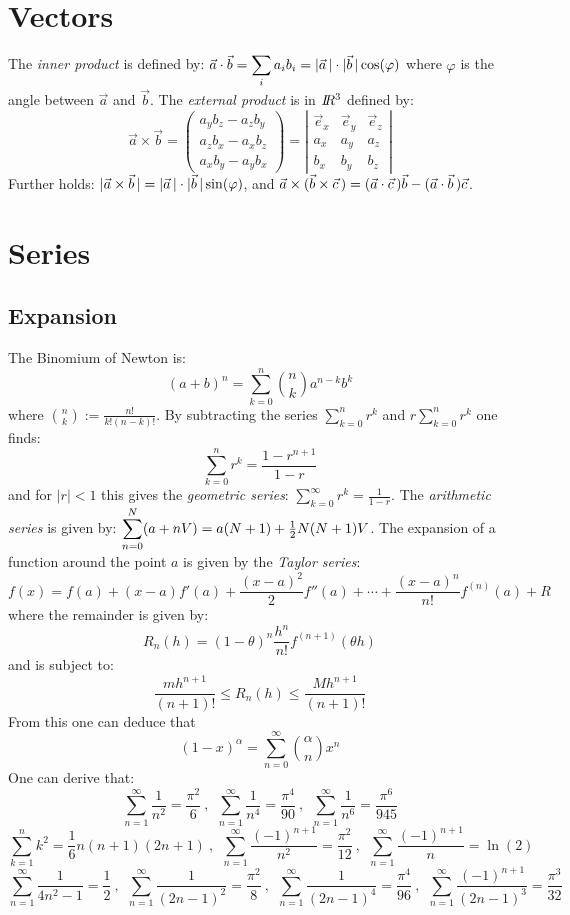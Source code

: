 \documentclass[a4paper,fancyheadings,twoside]{report}
\begin{document}
\section{Vectors}
The {\it inner product} is defined by:
$\displaystyle\vec{a}\cdot\vec{b}=\sum_i a_ib_i=|\vec{a}\,|\cdot|\vec{b}\,|\cos(\varphi)$
\npar
where $\varphi$ is the angle between $\vec{a}$ and $\vec{b}$. The {\it external
product} is in $I\hspace{-1mm}R^3$ defined by:
\[
\vec{a}\times\vec{b}=\left(\begin{array}{c}
a_yb_z-a_zb_y\\
a_zb_x-a_xb_z\\
a_xb_y-a_yb_x\end{array}\right)=
\left|\begin{array}{ccc}
\vec{e}_x&\vec{e}_y&\vec{e}_z\\
a_x&a_y&a_z\\
b_x&b_y&b_z\end{array}\right|
\]
Further holds: $|\vec{a}\times\vec{b}\,|=|\vec{a}\,|\cdot|\vec{b}\,|\sin(\varphi)$, and
$\vec{a}\times(\vec{b}\times\vec{c}\,)=(\vec{a}\cdot\vec{c}\,)\vec{b}-(\vec{a}\cdot\vec{b}\,)\vec{c}$.

\section{Series}
\subsection{Expansion}
The Binomium of Newton is:
\[
(a+b)^n=\sum_{k=0}^n{n\choose k}a^{n-k}b^k
\]
where $\displaystyle{n\choose k}:=\frac{n!}{k!(n-k)!}$.
\npar
By subtracting the series $\sum\limits_{k=0}^n r^k$ and $r\sum\limits_{k=0}^n r^k$
one finds:
\[
\sum_{k=0}^n r^k=\frac{1-r^{n+1}}{1-r}
\]
and for $|r|<1$ this gives the {\it geometric series}:
$\displaystyle\sum_{k=0}^\infty r^k=\frac{1}{1-r}$.
\npar
The {\it arithmetic series} is given by:
$\displaystyle\sum_{n=0}^N(a+nV)=a(N+1)+\mbox{$\frac{1}{2}$} N(N+1)V$.
\npar
The expansion of a function around the point $a$ is given by the
{\it Taylor series}:
\[
f(x)=f(a)+(x-a)f'(a)+\frac{(x-a)^2}{2}f''(a)+\cdots+\frac{(x-a)^n}{n!}f^{(n)}(a)+R
\]
where the remainder is given by:
\[
R_n(h)=(1-\theta)^n\frac{h^n}{n!}f^{(n+1)}(\theta h)
\]
and is subject to:
\[
\frac{mh^{n+1}}{(n+1)!}\leq R_n(h)\leq\frac{Mh^{n+1}}{(n+1)!}
\]
From this one can deduce that
\[
(1-x)^\alpha=\sum_{n=0}^\infty{\alpha\choose n}x^n
\]
One can derive that:
\[
\sum_{n=1}^\infty\frac{1}{n^2}=\frac{\pi^2}{6}~,~~
\sum_{n=1}^\infty\frac{1}{n^4}=\frac{\pi^4}{90}~,~~
\sum_{n=1}^\infty\frac{1}{n^6}=\frac{\pi^6}{945}
\]
\[
\sum_{k=1}^nk^2=\mbox{$\frac{1}{6}$}n(n+1)(2n+1)~,~~
\sum_{n=1}^\infty\frac{(-1)^{n+1}}{n^2}=\frac{\pi^2}{12}~,~~
\sum_{n=1}^\infty\frac{(-1)^{n+1}}{n}=\ln(2)
\]
\[
\sum_{n=1}^\infty\frac{1}{4n^2-1}=\mbox{$\frac{1}{2}$}~,~~
\sum_{n=1}^\infty\frac{1}{(2n-1)^2}=\frac{\pi^2}{8}~,~~
\sum_{n=1}^\infty\frac{1}{(2n-1)^4}=\frac{\pi^4}{96}~,~~
\sum_{n=1}^\infty\frac{(-1)^{n+1}}{(2n-1)^3}=\frac{\pi^3}{32}
\]
\end{document}

